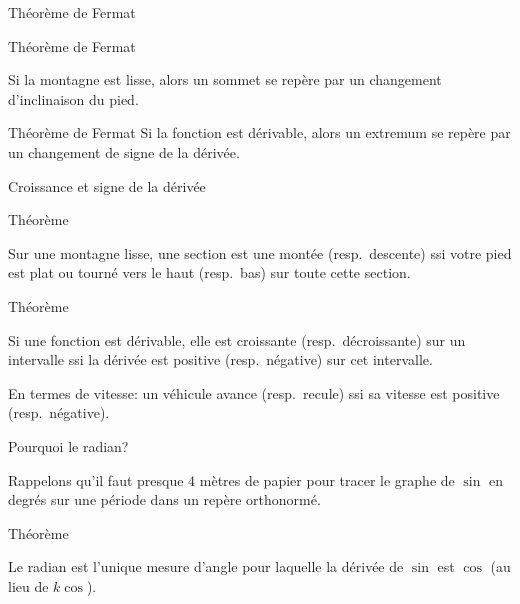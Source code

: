 \documentclass{beamer}
\begin{document}
\begin{frame}
    {Théorème de Fermat}

    \begin{exampleblock}
        {Théorème de Fermat}

        Si la montagne est lisse,
        alors un sommet se repère par un changement d'inclinaison du pied.
    \end{exampleblock}
    \pause{}

    \begin{alertblock}
        {Théorème de Fermat}
        Si la fonction est dérivable,
        alors un extremum se repère par un changement de signe de la dérivée.
    \end{alertblock}
\end{frame}

\begin{frame}
    {Croissance et signe de la dérivée}

    \begin{exampleblock}
        {Théorème}

        Sur une montagne lisse, une section est une montée (resp.\ descente) ssi votre pied est plat ou tourné vers le haut (resp.\ bas) sur toute cette section.
    \end{exampleblock}
    \pause{}

    \begin{alertblock}
        {Théorème}

        Si une fonction est dérivable, elle est croissante (resp.\ décroissante) sur un intervalle ssi la dérivée est positive (resp.\ négative) sur cet intervalle.
    \end{alertblock}

    \pause{}
    En termes de vitesse: un véhicule avance (resp.\ recule) ssi sa vitesse est positive (resp.\ négative).
\end{frame}

\begin{frame}
    {Pourquoi le radian?}

    Rappelons qu'il faut presque $4$ mètres de papier pour tracer le graphe de $\sin$ en degrés sur une période dans un repère orthonormé.
    \pause{}

    \begin{exampleblock}
        {Théorème}

        Le radian est l'unique mesure d'angle pour laquelle la dérivée de $\sin$ est $\cos$ (au lieu de $k \cos$).
    \end{exampleblock}
\end{frame}
\end{document}
